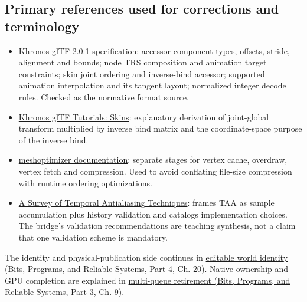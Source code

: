 \subsection{Primary references used for corrections and terminology}\label{04-visual-computing-ii-ch037-primary-references-used-for-corrections-and-terminology}

\hypertarget{04-visual-computing-ii-ch037-primary-references-used-for-corrections-and-terminology}{}

\begin{itemize}
\tightlist
\item
  \href{https://registry.khronos.org/glTF/specs/2.0/glTF-2.0.html}{Khronos glTF 2.0.1 specification}: accessor component types, offsets, stride, alignment and bounds; node TRS composition and animation target constraints; skin joint ordering and inverse-bind accessor; supported animation interpolation and its tangent layout; normalized integer decode rules. Checked as the normative format source.
\item
  \href{https://github.com/KhronosGroup/glTF-Tutorials/blob/main/gltfTutorial/gltfTutorial_020_Skins.md}{Khronos glTF Tutorials: Skins}: explanatory derivation of joint-global transform multiplied by inverse bind matrix and the coordinate-space purpose of the inverse bind.
\item
  \href{https://meshoptimizer.org/}{meshoptimizer documentation}: separate stages for vertex cache, overdraw, vertex fetch and compression. Used to avoid conflating file-size compression with runtime ordering optimizations.
\item
  \href{https://diglib.eg.org/items/cfa6a05c-53b3-4ee1-979d-48abc6225f6b}{A Survey of Temporal Antialiasing Techniques}: frames TAA as sample accumulation plus history validation and catalogs implementation choices. The bridge's validation recommendations are teaching synthesis, not a claim that one validation scheme is mandatory.
\end{itemize}

The identity and physical-publication side continues in \href{../01-Bits-Programs-and-Reliable-Systems-P04/main.pdf\#06-engine-ii-ch042-rendering-identity-becomes-world-identity-only-through-an-explicit-bridge}{editable world identity (Bits, Programs, and Reliable Systems, Part 4, Ch. 20)}. Native ownership and GPU completion are explained in \href{../01-Bits-Programs-and-Reliable-Systems-P03/main.pdf\#01-foundations-i-ch011-retire-a-resource-after-every-user-not-after-one-convenient-clock}{multi-queue retirement (Bits, Programs, and Reliable Systems, Part 3, Ch. 9)}.

